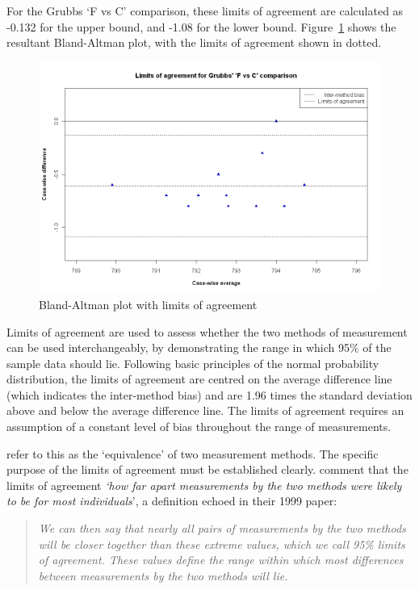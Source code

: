 \documentclass[12pt, a4paper]{report}
\theoremstyle{plain}
\theoremstyle{definition}
\theoremstyle{remark}
\begin{document}
For the Grubbs `F vs C' comparison, these limits of agreement are calculated as -0.132 for the upper bound, and -1.08 for the lower bound. Figure~\ref{GrubbsBAplot-noLOA} shows the resultant Bland-Altman plot, with the limits of agreement shown in dotted.

\begin{figure}[h!]
	\begin{center}
		\includegraphics[width=125mm]{images/GrubbsBAplot-LOA.jpeg}
		\caption{Bland-Altman plot with limits of agreement}
		\label{GrubbsBAplot-noLOA}
	\end{center}
\end{figure}

Limits of agreement are used to assess whether the two methods of
measurement can be used interchangeably, by demonstrating the range in which 95\% of the sample data should lie. Following basic principles of the normal probability distribution, the limits of agreement are centred on the average difference line (which indicates the inter-method bias) and are 1.96 times the standard deviation
above and below the average difference line. The limits of agreement requires an assumption of a constant level of bias throughout the range of measurements. 

\citet{BA86} refer to
this as the `equivalence' of two measurement methods. The specific purpose of the limits of
agreement must be
established clearly. \citet*{BA95} comment that the limits of agreement
\textit{`how
	far apart measurements by the two methods were likely to be for
	most individuals}', a definition echoed in their 1999 paper:

\begin{quote}
\textit{We can then say that nearly all pairs
	of measurements by the two methods will be closer together than
	these extreme values, which we call 95\% limits of agreement.
	These values define the range within which most differences
	between measurements by the two methods will lie.}
\end{quote}
\end{document}

